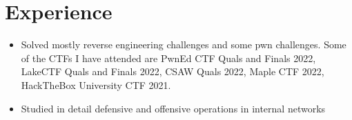 \documentclass{resume}
\begin{document}



\section{Experience}

\begin{itemize}
  \item Solved mostly reverse engineering challenges and some pwn challenges. Some of the CTFs I have attended are PwnEd CTF Quals and Finals 2022, LakeCTF Quals and Finals 2022, CSAW Quals 2022, Maple CTF 2022, HackTheBox University CTF 2021.
\end{itemize}

\begin{itemize}
  \item Studied in detail defensive and offensive operations in internal networks
\end{itemize}
\end{document}
